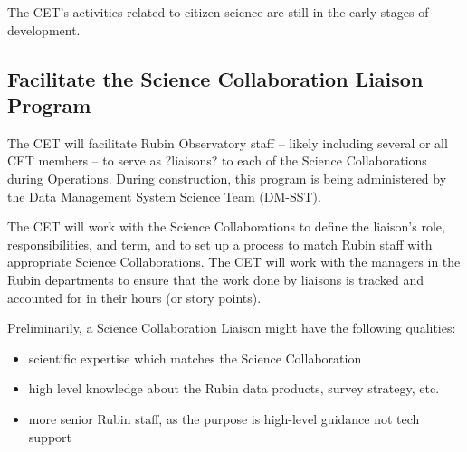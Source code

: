 \documentclass[DM,lsstdraft,toc]{lsstdoc}
\begin{document}
The CET's activities related to citizen science are still in the early stages of development.


\subsection{Facilitate the Science Collaboration Liaison Program}\label{ssec:mod_liaisons}

The CET will facilitate Rubin Observatory staff -- likely including several or all CET members -- to serve as ?liaisons? to each of the Science Collaborations during Operations. 
During construction, this program is being administered by the Data Management System Science Team (DM-SST).

The CET will work with the Science Collaborations to define the liaison's role, responsibilities, and term, and to set up a process to match Rubin staff with appropriate Science Collaborations.
The CET will work with the managers in the Rubin departments to ensure that the work done by liaisons is tracked and accounted for in their hours (or story points). 

Preliminarily, a Science Collaboration Liaison might have the following qualities:
\begin{itemize}
\item scientific expertise which matches the Science Collaboration
\item high level knowledge about the Rubin data products, survey strategy, etc. 
\item more senior Rubin staff, as the purpose is high-level guidance not tech support
\end{itemize}
\end{document}
